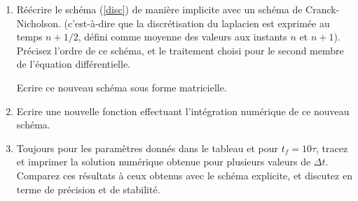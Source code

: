 \documentclass[a4,12pt]{article}
\begin{document}
\begin{enumerate}
\item R\'e\'ecrire le sch\'ema (\ref{disc}) de mani\`ere implicite avec un schéma de Cranck-Nicholson.
(c'est-\`a-dire que la discr\'etisation du laplacien est exprim\'ee au temps $n+1/2$, défini comme 
moyenne des valeurs aux instants $n$ et $n+1$). Précisez l'ordre de ce schéma, et le traitement 
choisi pour le second membre de l'équation différentielle.


Ecrire ce nouveau schéma sous forme matricielle. 

\item Ecrire une nouvelle fonction effectuant l'intégration numérique de ce nouveau schéma.

\item Toujours pour les paramètres donnés dans le tableau et pour $t_f = 10 \tau$, tracez et imprimer la solution numérique obtenue pour plusieurs valeurs de $\Delta t$. Comparez ces résultats à ceux obtenus avec le schéma explicite, et discutez en terme de précision et de stabilité.


\end{enumerate}
\end{document}
